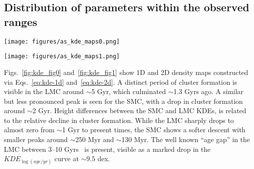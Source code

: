 \documentclass[draft]{aa}
\begin{document}

\subsection{Distribution of parameters within the observed ranges}
\label{ssec:dist_ranges}

\begin{figure*}
\texttt{[image: figures/as\_kde\_maps0.png]}
\caption{Adaptive Gaussian KDEs for age, metallicity, and mass. Top and right
plots are 1D KDEs, center plots are 2D KDEs. Observed clusters are plotted as
red and blue stars for the S/LMC, respectively. Sizes are scaled according to
each cluster's radius. A small scatter is introduced for clarity.}
\label{fig:kde_fig0}
\end{figure*}

\begin{figure*}
\texttt{[image: figures/as\_kde\_maps1.png]}
\caption{Same as Fig.~\ref{fig:kde_fig0} for $E_{(B-V)}$ and distance
modulus.}
\label{fig:kde_fig1}
\end{figure*}

Figs.~\ref{fig:kde_fig0} and~\ref{fig:kde_fig1} show 1D and 2D density maps
constructed via Eqs.~\ref{eq:kde-1d} and~\ref{eq:kde-2d}.
%
%
A distinct period of cluster formation is visible in the LMC around ${\sim}$5
Gyr, which culminated ${\sim}$1.3 Gyrs ago. A similar but less
pronounced peak is seen for the SMC, with a drop in cluster formation around
${\sim}$2 Gyr.
Height differences between the SMC and LMC KDEs, is related to the relative
decline in cluster formation. While the LMC sharply drops to almost zero from
${\sim}$1 Gyr to present times, the SMC shows a softer descent with smaller
peaks around ${\sim}$250 Myr and ${\sim}$130 Myr.
The well known ``age gap'' in the LMC between 3--10 Gyrs~\citep{Balbinot_2010}
is present, visible as a marked drop in the $KDE_{\log(age/yr)}$ curve at
$\sim9.5$ dex.
\end{document}
